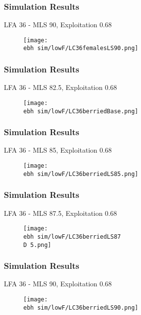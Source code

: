 \documentclass{beamer}
\newcommand{\ebh}{/SpinDr/backup/bio_data/bio.lobster/figures/LFA3438Framework2019/Brad/} %
\newcommand{\D}{.}
\begin{document}
\begin{frame}
\frametitle{Simulation Results}
LFA 36 - MLS 90, Exploitation 0.68
\begin{figure}
        \begin{center}
            \texttt{[image: \\ebh sim/lowF/LC36femalesLS90.png]}
        \end{center}
    \end{figure}
\end{frame}




\begin{frame}
\frametitle{Simulation Results}
LFA 36 - MLS 82.5, Exploitation 0.68
\begin{figure}
        \begin{center}
            \texttt{[image: \\ebh sim/lowF/LC36berriedBase.png]}
        \end{center}
    \end{figure}
\end{frame}



\begin{frame}
\frametitle{Simulation Results}
LFA 36 - MLS 85, Exploitation 0.68
\begin{figure}
        \begin{center}
            \texttt{[image: \\ebh sim/lowF/LC36berriedLS85.png]}
        \end{center}
    \end{figure}
\end{frame}


\begin{frame}
\frametitle{Simulation Results}
LFA 36 - MLS 87.5, Exploitation 0.68
\begin{figure}
        \begin{center}
            \texttt{[image: \\ebh sim/lowF/LC36berriedLS87\\D 5.png]}
        \end{center}
    \end{figure}
\end{frame}


\begin{frame}
\frametitle{Simulation Results}
LFA 36 - MLS 90, Exploitation 0.68
\begin{figure}
        \begin{center}
            \texttt{[image: \\ebh sim/lowF/LC36berriedLS90.png]}
        \end{center}
    \end{figure}
\end{frame}
\end{document}
